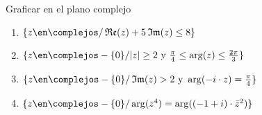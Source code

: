 \def\pReal{\ensuremath{\operatorname{\mathfrak{Re}}(z)}} %
\def\pIm{\ensuremath{\operatorname{\mathfrak{Im}}(z)}} %

\begin{enunciado}{\ejercicio}
Graficar en el plano complejo
\begin{enumerate}[label=\roman*)]
 \item $\{z \en \complejos / \pReal + 5\pIm \leq 8\}$
 \item $\{z \en \complejos - \{0\} / |z| \geq 2 \text{ y } \frac{\pi}{4} \leq \arg(z) \leq \frac{2\pi}{3}\}$
 \item $\{z \en \complejos - \{0\} / \pIm > 2 \text{ y } \arg(-i \cdot z) = \frac{\pi}{4}\}$
 \item $\{z \en \complejos - \{0\} / \arg(z^4) = \arg((-1 + i)\cdot \bar{z}^2)\}$
\end{enumerate}
\end{enunciado}

\usetikzlibrary{calc}

